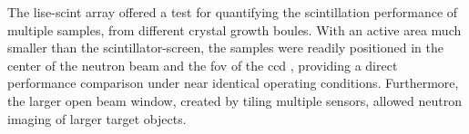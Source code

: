 \documentclass[../../../main.tex]{subfiles}%
\begin{document}
%
    \Xsubsection%
    The \gls{lise-scint} array offered a test for quantifying the scintillation performance of multiple samples, from different crystal growth boules.
    With an active area much smaller than the \gls{scintillator-screen}, the samples were readily positioned in the center of the neutron beam and the \gls{fov} of the \gls{ccd} , providing a direct performance comparison under near identical operating conditions.
    Furthermore, the larger open beam window, created by tiling multiple sensors, allowed neutron imaging of larger target objects.
\end{document}
